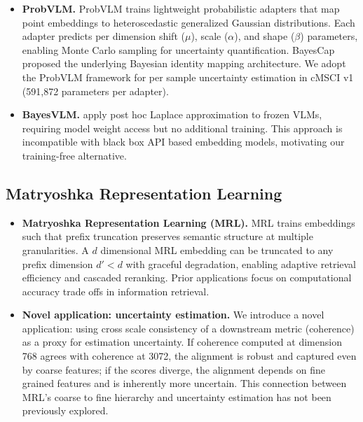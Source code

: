 \documentclass[a4paper,fleqn]{cas-sc}
\begin{document}
\begin{itemize}

\item \textbf{ProbVLM.}
ProbVLM \citep{upadhyay2023probvlm} trains lightweight probabilistic adapters that map point embeddings to heteroscedastic generalized Gaussian distributions. Each adapter predicts per dimension shift ($\mu$), scale ($\alpha$), and shape ($\beta$) parameters, enabling Monte Carlo sampling for uncertainty quantification. BayesCap \citep{upadhyay2022bayescap} proposed the underlying Bayesian identity mapping architecture. We adopt the ProbVLM framework for per sample uncertainty estimation in cMSCI v1 (591,872 parameters per adapter).

\item \textbf{BayesVLM.}
\citet{baumann2026bayesvlm} apply post hoc Laplace approximation to frozen VLMs, requiring model weight access but no additional training. This approach is incompatible with black box API based embedding models, motivating our training-free alternative.

\end{itemize}

\subsection{Matryoshka Representation Learning}\label{sec:mrl-related}

\begin{itemize}

\item \textbf{Matryoshka Representation Learning (MRL).}
MRL \citep{kusupati2022matryoshka} trains embeddings such that prefix truncation preserves semantic structure at multiple granularities. A $d$ dimensional MRL embedding can be truncated to any prefix dimension $d' < d$ with graceful degradation, enabling adaptive retrieval efficiency and cascaded reranking. Prior applications focus on computational accuracy trade offs in information retrieval.

\item \textbf{Novel application: uncertainty estimation.}
We introduce a novel application: using cross scale consistency of a downstream metric (coherence) as a proxy for estimation uncertainty. If coherence computed at dimension 768 agrees with coherence at 3072, the alignment is robust and captured even by coarse features; if the scores diverge, the alignment depends on fine grained features and is inherently more uncertain. This connection between MRL's coarse to fine hierarchy and uncertainty estimation has not been previously explored.

\end{itemize}
\end{document}
